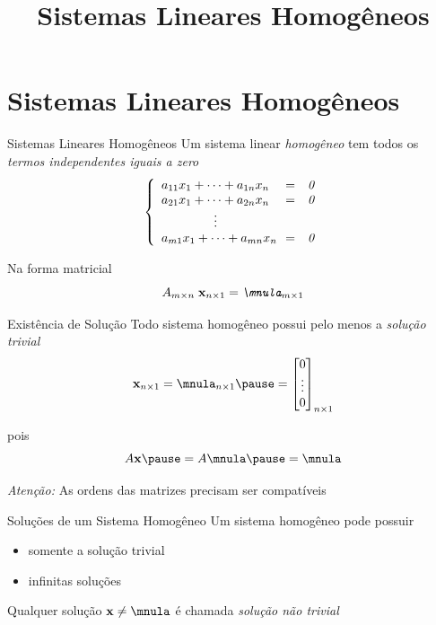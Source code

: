 \documentclass[fleqn,aspectratio=169,12pt]{beamer}
\title{Sistemas Lineares Homogêneos}
\begin{document}
\addtitle

\section{Sistemas Lineares Homogêneos}

\begin{frame}{Sistemas Lineares Homogêneos}
  Um sistema linear \emph{homogêneo} tem todos os
  \emph{termos independentes iguais a zero}
  \pause
  \[
    \left\{\begin{array}{lll}
      a_{11} x_1 + \cdots + a_{1n} x_n    & \!\! = & \emph{0} \\
      a_{21} x_1 + \cdots + a_{2n} x_n    & \!\! = & \emph{0} \\
      \hphantom{a_{21} x_1 + } \quad \vdots &        &   \\
      a_{m1} x_1 + \cdots + a_{mn} x_n    & \!\! = & \emph{0}
    \end{array}\right.
  \]

  \pause
  Na forma matricial
  \[
    A_{m\times n} \; \mathbf{x}_{n\times 1} = \emph{\mnula}_{m\times 1}
  \]
\end{frame}

\begin{frame}{Existência de Solução}
  Todo sistema homogêneo possui pelo menos a \emph{solução trivial}
  \pause
  \[
    \mathbf{x}_{n\times 1}
    =
    \mnula_{n\times 1}
    \pause
    =
    \begin{bmatrix}
      0      \\
      \multicolumn{1}{c}{\vdots} \\
      0
    \end{bmatrix}_{n\times 1}
  \]

  \pause
  pois
  \[
    A\mathbf{x}
    \pause
    = A\mnula
    \pause
    = \mnula
  \]

  \emph{Atenção:} As ordens das matrizes precisam ser compatíveis
\end{frame}

\begin{frame}{Soluções de um Sistema Homogêneo}
  Um sistema homogêneo pode possuir
  \pause
  \begin{itemize}
    \item somente a solução trivial
    \pause
    \item infinitas soluções
  \end{itemize}

  \pause
  \bigskip
  Qualquer solução
  \;\(
    \mathbf{x} \neq \mnula
  \)\;
  \pause
  é chamada \emph{solução não trivial}
\end{frame}
\end{document}
